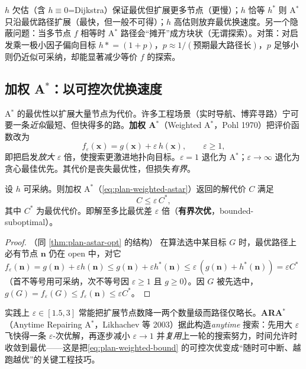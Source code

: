 \begin{pitfall}
$h$ 欠估（含 $h\equiv0$=Dijkstra）保证最优但扩展更多节点（更慢）；$h$ 恰等 $h^*$ 则 A$^*$ 只沿最优路径扩展（最快，但一般不可得）；$h$ 高估则放弃最优换速度。另一个隐蔽问题：当多节点 $f$ 相等时 A$^*$ 路径会“摊开”成方块状（无谓探索）。对策：对启发乘一极小因子偏向目标 $h\mathrel{*}=(1+p)$，$p\approx1/(\text{预期最大路径长})$，$p$ 足够小则仍近似可采纳，却能显著减少等价 $f$ 的探索。
\end{pitfall}

\subsection{加权 A\texorpdfstring{$^*$}{^*}：以可控次优换速度}
\label{sec:plan-weighted}

A$^*$ 的最优性以扩展大量节点为代价。许多工程场景（实时导航、博弈寻路）宁可要一条\emph{近似}最短、但快得多的路。\textbf{加权 A$^*$}（Weighted A$^*$，Pohl 1970）把评价函数改为
\begin{equation}
  f_\varepsilon(\mathbf{x})=g(\mathbf{x})+\varepsilon\,h(\mathbf{x}),\qquad\varepsilon\ge1,
  \label{eq:plan-weighted-astar}
\end{equation}
即把启发\emph{放大} $\varepsilon$ 倍，使搜索更激进地扑向目标。$\varepsilon=1$ 退化为 A$^*$；$\varepsilon\to\infty$ 退化为贪心最佳优先。其代价是丧失最优性，但损失\emph{有界}。

\begin{theorem}\label{thm:plan-weighted}
设 $h$ 可采纳。则加权 A$^*$（\cref{eq:plan-weighted-astar}）返回的解代价 $C$ 满足
\begin{equation}
  C\le\varepsilon\,C^*,
  \label{eq:plan-weighted-bound}
\end{equation}
其中 $C^*$ 为最优代价。即解至多比最优差 $\varepsilon$ 倍（\textbf{有界次优}，bounded-suboptimal）。
\end{theorem}
\begin{proof}（同 \cref{thm:plan-astar-opt} 的结构）
在算法选中某目标 $G$ 时，最优路径上必有节点 $\mathbf{n}$ 仍在 open 中，对它 $f_\varepsilon(\mathbf{n})=g(\mathbf{n})+\varepsilon h(\mathbf{n})\le g(\mathbf{n})+\varepsilon h^*(\mathbf{n})\le\varepsilon\,(g(\mathbf{n})+h^*(\mathbf{n}))=\varepsilon C^*$（首不等号用可采纳，次不等号因 $\varepsilon\ge1$ 且 $g\ge0$）。因 $G$ 被先选中，$g(G)=f_\varepsilon(G)\le f_\varepsilon(\mathbf{n})\le\varepsilon C^*$。
\end{proof}

\noindent 实践上 $\varepsilon\in[1.5,3]$ 常能把扩展节点数降一两个数量级而路径仅略长。\textbf{ARA$^*$}（Anytime Repairing A$^*$，Likhachev 等 2003\cite{likhachev2004ara}）据此构造\emph{anytime} 搜索：先用大 $\varepsilon$ 飞快得一条 $\varepsilon$-次优解，再逐步减小 $\varepsilon\to1$ 并\emph{复用}上一轮的搜索努力，时间允许时收敛到最优——这是把\cref{eq:plan-weighted-bound} 的可控次优变成“随时可中断、越跑越优”的关键工程技巧。

